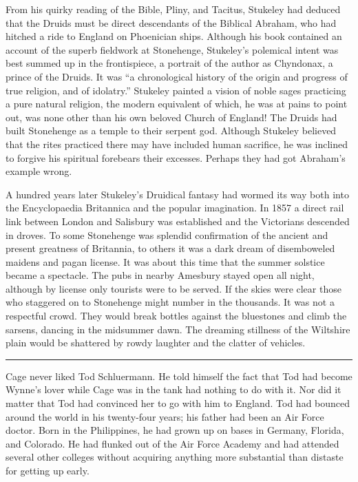From his quirky reading of the Bible, Pliny, and Tacitus, Stukeley had deduced that the Druids must be direct descendants of the Biblical Abraham, who had hitched a ride to England on Phoenician ships. Although his book contained an account of the superb fieldwork at Stonehenge, Stukeley's polemical intent was best summed up in the frontispiece, a portrait of the author as Chyndonax, a prince of the Druids. It was ``a chronological history of the origin and progress of true religion, and of idolatry.'' Stukeley painted a vision of noble sages practicing a pure natural religion, the modern equivalent of which, he was at pains to point out, was none other than his own beloved Church of England! The Druids had built Stonehenge as a temple to their serpent god. Although Stukeley believed that the rites practiced there may have included human sacrifice, he was inclined to forgive his spiritual forebears their excesses. Perhaps they had got Abraham's example wrong.

A hundred years later Stukeley's Druidical fantasy had wormed its way both into the Encyclopaedia Britannica and the popular imagination. In 1857 a direct rail link between London and Salisbury was established and the Victorians descended in droves. To some Stonehenge was splendid confirmation of the ancient and present greatness of Britannia, to others it was a dark dream of disemboweled maidens and pagan license. It was about this time that the summer solstice became a spectacle. The pubs in nearby Amesbury stayed open all night, although by license only tourists were to be served. If the skies were clear those who staggered on to Stonehenge might number in the thousands. It was not a respectful crowd. They would break bottles against the bluestones and climb the sarsens, dancing in the midsummer dawn. The dreaming stillness of the Wiltshire plain would be shattered by rowdy laughter and the clatter of vehicles.

\fancybreak{* * *}

Cage never liked Tod Schluermann. He told himself the fact that Tod had become Wynne's lover while Cage was in the tank had nothing to do with it. Nor did it matter that Tod had convinced her to go with him to England. Tod had bounced around the world in his twenty-four years; his father had been an Air Force doctor. Born in the Philippines, he had grown up on bases in Germany, Florida, and Colorado. He had flunked out of the Air Force Academy and had attended several other colleges without acquiring anything more substantial than distaste for getting up early.

